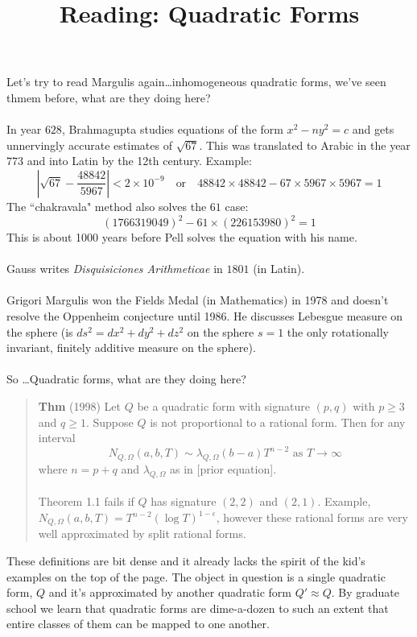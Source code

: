 \documentclass[12pt]{article}
\title{Reading: Quadratic Forms}
\date{}
\begin{document}
\sffamily

\maketitle

\noindent Let's try to read Margulis again\dots inhomogeneous quadratic forms, we've seen thmem before, what are they doing here?  \\ \\
In year $628$, Brahmagupta studies equations of the form $x^2 - ny^2 = c$ and gets unnervingly accurate estimates of $\sqrt{67}$. This was translated to Arabic in the year $773$ and into Latin by the 12th century. Example:
$$ \left| \sqrt{67} - \frac{48842}{5967} \right| < 2 \times 10^{-9} \quad\text{or}\quad 48842 \times 48842 - 67 \times 5967 \times 5967 = 1 $$
The ``chakravala" method also solves the $61$ case:
$$ (1766319049)^2 - 61 \times (226153980)^2 = 1 $$
This is about 1000 years before Pell solves the equation with his name.
\\ \\
Gauss writes \textit{Disquisiciones Arithmeticae} in $1801$ (in Latin). \\ \\
Grigori Margulis won the Fields Medal (in Mathematics) in 1978 and doesn't resolve the Oppenheim conjecture until 1986.  He discusses Lebesgue measure on the sphere (is $ds^2 = dx^2 + dy^2 + dz^2$ on the sphere $s = 1$ the only rotationally invariant, finitely additive measure on the sphere). \\ \\
So \dots Quadratic forms, what are they doing here?
\begin{quotation}\noindent \textbf{Thm} (1998) Let $Q$ be a quadratic form with signature $(p,q)$ with $p \geq 3$ and $q \geq 1$.  Suppose $Q$ is not proportional to a rational form.   Then for any interval 
$$ N_{Q, \Omega} (a,b, T) \sim \lambda_{Q, \Omega} (b-a)T^{n-2} \text{ as } T \to \infty $$
where $n = p+q$ and $\lambda_{Q, \Omega}$ as in [prior equation]. \\ \\
Theorem 1.1 fails if $Q$ has signature $(2,2)$ and $(2,1)$.  Example, $N_{Q, \Omega}(a,b,T) = T^{n-2}(\log T)^{1-\epsilon} $, however these rational forms are very well approximated by split rational forms.\end{quotation}
These definitions are bit dense and it already lacks the spirit of the kid's examples on the top of the page. The object in question is a single quadratic form, $Q$ and it's approximated by another quadratic form $Q' \approx Q$.  By graduate school we learn that quadratic forms are dime-a-dozen to such an extent that entire classes of them can be mapped to one another. \\ \\
\end{document}

